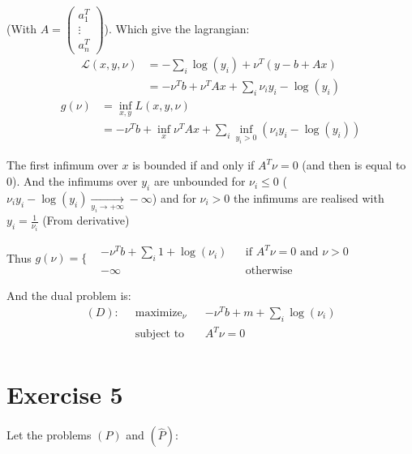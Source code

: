 \documentclass{article}
\begin{document}
(With $A = \begin{pmatrix}
        a_1^T  \\
        \vdots \\
        a_n^T
    \end{pmatrix}$). Which give the lagrangian:
\begin{equation*}
    \begin{aligned}
        \mathcal{L}(x, y, \nu) & = -\sum_i \log(y_i) + \nu^T(y -b + Ax)             \\
                               & = -\nu^Tb + \nu^TAx + \sum_i \nu_i y_i - \log(y_i)
    \end{aligned}
\end{equation*}
\begin{equation*}
    \begin{aligned}
        g(\nu) & = \inf_{x,y} L(x,y,\nu)                                                 \\
               & = -\nu^Tb + \inf_x \nu^TAx + \sum_i \inf_{y_i>0}(\nu_i y_i - \log(y_i))
    \end{aligned}
\end{equation*}

The first infimum over $x$ is bounded if and only if $A^T\nu = 0$ (and then is equal to 0). And the infimums over $y_i$ are
unbounded for $\nu_i \le 0$ ($\nu_i y_i - \log(y_i) \underset{y_i \rightarrow +\infty}{\longrightarrow} -\infty$) and for $\nu_i > 0$ the infimums are
realised with $y_i = \frac{1}{\nu_i}$ (From derivative)

Thus $g(\nu) = \Bigg\{\begin{aligned}
         & -\nu^Tb + \sum_i 1 + \log(\nu_i) &  & \text{if } A^T\nu = 0 \text{ and } \nu > 0 \\
         & -\infty                          &  & \text{otherwise}
    \end{aligned} $


And the dual problem is:
\begin{equation*}
    \begin{aligned}
        (D):\;\; & \text{maximize}_\nu &  & -\nu^Tb + m + \sum_i \log(\nu_i) \\
                 & \text{subject to}   &  & A^T\nu = 0                       \\
    \end{aligned}
\end{equation*}

\section{Exercise 5}
Let the problems $(P)$ and $(\hat{P})$:
\end{document}
